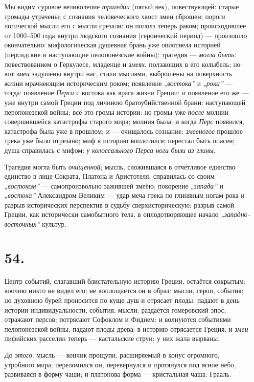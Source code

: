 \documentclass[12pt,a4paper,oneside]{book}
\begin{document}
Мы видим суровое великолепие \emph{трагедии} (пятый век), повествующей: старые громады утрачены; с сознания человеческого хвост змеи сброшен; пороги логической мысли его с мысли срезали: он пополз теперь раком; происходившее от 1000–500 года внутри людского сознания (героический период) — произошло окончательно: мифологическая душевная брань уже оплотнела историей (персидские и наступающие пелопонезские войны); трагедия — \emph{могла быть}: повествованием о Геркулесе, младенце и \emph{змеях}, ползающих в его колыбель; но вот \emph{змеи} задушены внутри нас, стали мыслями, выброшены на поверхность жизни мрачнеющим историческим роком; появление \emph{„востока”} и \emph{„рока”} — тогда: появление \emph{Перса} с востока как врага жизни Греции; и появление его же — уже внутри самой Греции под личиною братоубийственной брани: наступающей перопонезской войны; всё это громы истории: но громы уже \emph{после} молнии совершившейся катастрофы старого мира; молния была; и когда \emph{Перс} появился, катастрофа была уже в прошлом; и — очищалось сознание: \emph{змееногое} прошлое грека уже было отрезано; миф в историю воплотился; перестал быть опасен; душа справилась с мифом: \emph{у колоссального Перса ноги были из глины}.

Трагедия могла быть \emph{очищенной}; мысль, сложившаяся в отчётливое единство единство в лице Сократа, Платона и Аристотеля, справилась со своим \emph{„востоком”} — самопроизвольно зажившей змеёю; покорение \emph{„запада”} и \emph{„востока”} Александром Великим — удар меча грека по глиняным ногам рока и разрыв исторических перспектив в судьбу сверхисторическую: разрыв самой Греции, как исторически самобытного тела, в оплодотворяющее начало \emph{„западно-восточных”} культур.

\section*{54.}

Центр событий, слагавший блистательную историю Греции, остаётся сокрытым; воочию никто не видел его; не воплощается он в образ: мысли, герои, события; но духовною бурей проносится по куще душ и отрясает плоды: падают в день истории индивидуальности, события, мысли: раздаётся гомеровский эпос; отражают персов; потрясают Софоклом и Фидием; и волнуются событиями пелопонезской войны, падают плоды древа: в историю отрясается Греция; и \emph{змеи} пифийских расселин теперь — кастальские струи; у них жала вырваны.

До \emph{этого}: мысль — кончик прощупи, расширяемый в конус огромного, утробного мира; переломился он, перевернулся и протянулся под ясное небо, развиваяся в форму чаши; и платонова форма — кристальная чаша: Грааль.
\end{document}
